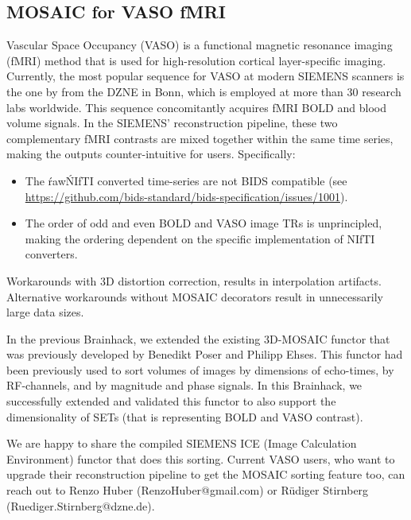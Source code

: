 \documentclass[../main.tex]{subfiles}
\begin{document}
\subsection{MOSAIC for VASO fMRI}\label{sec:vasomosaic}


Vascular Space Occupancy (VASO) is a functional magnetic resonance imaging (fMRI) method that is used for high-resolution cortical layer-specific imaging\citep{Huber2021a}. Currently, the most popular sequence for VASO at modern SIEMENS scanners is the one by \textcite{Stirnberg2021a} from the DZNE in Bonn, which is employed at more than 30 research labs worldwide. This sequence concomitantly acquires fMRI BOLD and blood volume signals. In the SIEMENS' reconstruction pipeline, these two complementary fMRI contrasts are mixed together within the same time series, making the outputs counter-intuitive for users. Specifically:

\begin{itemize}
    \item The \'raw\' NIfTI converted time-series are not BIDS compatible (see \url{https://github.com/bids-standard/bids-specification/issues/1001}).
    
    \item The order of odd and even BOLD and VASO image TRs is unprincipled, making the ordering dependent on the specific implementation of NIfTI converters.
\end{itemize}

Workarounds with 3D distortion correction, results in interpolation artifacts. Alternative workarounds without MOSAIC decorators result in unnecessarily large data sizes.

In the previous Brainhack\citep{Gau2021}, we extended the existing 3D-MOSAIC functor that was previously developed by Benedikt Poser and Philipp Ehses. This functor had been previously used to sort volumes of images by dimensions of echo-times, by RF-channels, and by magnitude and phase signals. In this Brainhack, we successfully extended and validated this functor to also support the dimensionality of SETs (that is representing BOLD and VASO contrast).

We are happy to share the compiled SIEMENS ICE (Image Calculation Environment) functor that does this sorting. Current VASO users, who want to upgrade their reconstruction pipeline to get the MOSAIC sorting feature too, can reach out to Renzo Huber (RenzoHuber@gmail.com) or R\"udiger Stirnberg (Ruediger.Stirnberg@dzne.de).
\end{document}
